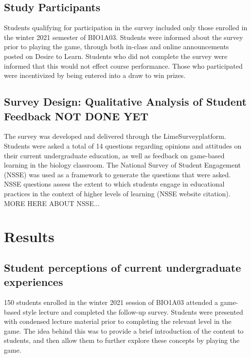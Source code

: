 \documentclass{article}
\begin{document}
\subsection{Study Participants}

Students qualifying for participation in the survey included only those enrolled in the winter 2021 semester of BIO1A03. Students were informed about the survey prior to playing the game, through both in-class and online announcements posted on Desire to Learn. Students who did not complete the survey were informed that this would not effect course performance. Those who participated were incentivized by being entered into a draw to win prizes.

\subsection{Survey Design: Qualitative Analysis of Student Feedback NOT DONE YET}

The survey was developed and delivered through the LimeSurvey\textregistered \space platform. Students were asked a total of 14 questions regarding opinions and attitudes on their current undergraduate education, as well as feedback on game-based learning in the biology classroom. The National Survey of Student Engagement (NSSE) was used as a framework to generate the questions that were asked. NSSE questions assess the extent to which students engage in educational practices in the context of higher levels of learning (NSSE website citation). MORE HERE ABOUT NSSE...

\section{Results}

\subsection{Student perceptions of current undergraduate experiences}

150 students enrolled in the winter 2021 session of BIO1A03 attended a game-based style lecture and completed the follow-up survey. Students were presented with condensed lecture material prior to completing the relevant level in the game. The idea behind this was to provide a brief introduction of the content to students, and then allow them to further explore these concepts by playing the game. 
\end{document}
